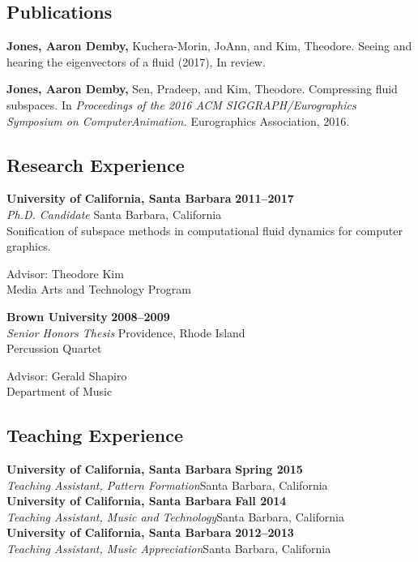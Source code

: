{\subsection*{Publications}
{\bfseries Jones, Aaron Demby,} Kuchera-Morin, JoAnn, and Kim, Theodore. Seeing and hearing the eigenvectors of a fluid (2017), In review.

{\bfseries Jones, Aaron Demby,} Sen, Pradeep, and Kim, Theodore. Compressing fluid subspaces. In {\itshape Proceedings of the 2016 ACM SIGGRAPH/Eurographics Symposium on ComputerAnimation.} Eurographics Association, 2016.

\subsection*{Research Experience}

{\bf University of California, Santa Barbara} \hfill {\bf 2011--2017}\\
{\em Ph.D. Candidate} \hfill Santa Barbara, California\\
Sonification of subspace methods in computational fluid dynamics for computer graphics.

Advisor: Theodore Kim\\
Media Arts and Technology Program

{\bf Brown University} \hfill {\bf 2008--2009}\\
{\em Senior Honors Thesis} \hfill Providence, Rhode Island\\
Percussion Quartet

Advisor: Gerald Shapiro\\
Department of Music

\subsection*{Teaching Experience}
{\bf University of California, Santa Barbara}  \hfill {\bf Spring 2015}\\
{\em Teaching Assistant, Pattern Formation}\hfill  Santa Barbara, California\\

{\bf University of California, Santa Barbara} \hfill {\bf Fall 2014}\\
{\em Teaching Assistant, Music and Technology}\hfill  Santa Barbara, California\\

{\bf University of California, Santa Barbara} \hfill {\bf 2012--2013}\\
{\em Teaching Assistant, Music Appreciation}\hfill  Santa Barbara, California\\

}
